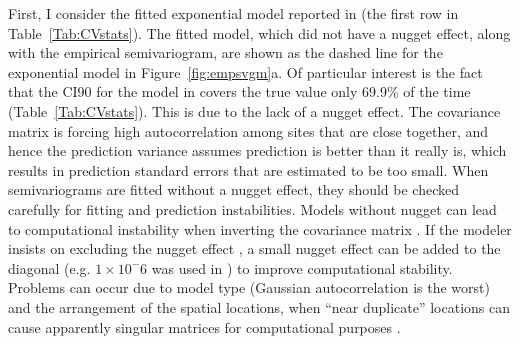 \documentclass[11pt, titlepage]{article}\usepackage[]{graphicx}\usepackage[]{color}
\begin{document}
\begin{spacing}{1.9}
\begin{flushleft}
First, I consider the fitted exponential model reported in \citet{Ladl:Avga:Whea:Boyc:pred:2016} (the first row in Table~\ref{Tab:CVstats}).  The fitted model, which did not have a nugget effect, along with the empirical semivariogram, are shown as the dashed line for the exponential model in Figure~\ref{fig:empsvgm}a.  Of particular interest is the fact that the CI90 for the model in \citet{Ladl:Avga:Whea:Boyc:pred:2016} covers the true value only 69.9\% of the time (Table~\ref{Tab:CVstats}). This is due to the lack of a nugget effect. The covariance matrix is forcing high autocorrelation among sites that are close together, and hence the prediction variance assumes prediction is better than it really is, which results in prediction standard errors that are estimated to be too small. When semivariograms are fitted without a nugget effect, they should be checked carefully for fitting and prediction instabilities. Models without nugget can lead to computational instability when inverting the covariance matrix \citep{Diam:Arms:robu:1984,Posa:cond:1989,ODow:cond:1991,Abab:cond:1994}. If the modeler insists on excluding the nugget effect \citep[as often occurs when using kriging to approximate deterministic computer models, e.g.][]{Mart:Simp:krig:2005}, a small nugget effect can be added to the diagonal (e.g. $1 \times 10^-6$ was used in \citet{Book:Denn:Fran:Sera:etal:rigo:1999}) to improve computational stability.  Problems can occur due to model type (Gaussian autocorrelation is the worst) and the arrangement of the spatial locations, when ``near duplicate'' locations can cause apparently singular matrices for computational purposes \citep[][p. 220]{Biva:Pebe:Gome:appl:2008}.


\end{flushleft}
\end{spacing}
\end{document}
